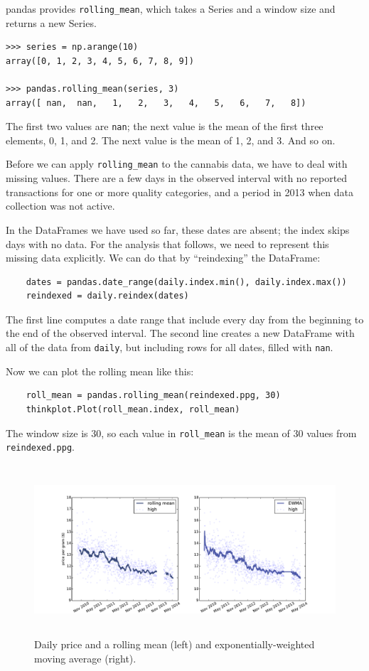 \documentclass[12pt]{book}
\begin{document}
pandas provides \verb"rolling_mean", which takes a Series and a
window size and returns a new Series.

\begin{verbatim}
>>> series = np.arange(10)
array([0, 1, 2, 3, 4, 5, 6, 7, 8, 9])

>>> pandas.rolling_mean(series, 3)
array([ nan,  nan,   1,   2,   3,   4,   5,   6,   7,   8])
\end{verbatim}

The first two values are {\tt nan}; the next value is the mean of
the first three elements, 0, 1, and 2.  The next value is the mean
of 1, 2, and 3.  And so on.

Before we can apply \verb"rolling_mean" to the cannabis data, we
have to deal with missing values.  There are a few days in the
observed interval with no reported transactions for one or more
quality categories, and a period in 2013 when data collection was
not active.

In the DataFrames we have used so far, these dates are absent;
the index skips days with no data.  For the analysis that follows,
we need to represent this missing data explicitly.  We can do
that by ``reindexing'' the DataFrame:
 
\begin{verbatim}
    dates = pandas.date_range(daily.index.min(), daily.index.max())
    reindexed = daily.reindex(dates)
\end{verbatim}

The first line computes a date range that include every day from the
beginning to the end of the observed interval.  The second line
creates a new DataFrame with all of the data from {\tt daily}, but
including rows for all dates, filled with {\tt nan}.

Now we can plot the rolling mean like this:

\begin{verbatim}
    roll_mean = pandas.rolling_mean(reindexed.ppg, 30)
    thinkplot.Plot(roll_mean.index, roll_mean)
\end{verbatim}

The window size is 30, so each value in \verb"roll_mean" is
the mean of 30 values from {\tt reindexed.ppg}.  

\begin{figure}
\centerline{\includegraphics[height=2.5in]{figs/timeseries10.pdf}}
\caption{Daily price and a rolling mean (left) and exponentially-weighted
moving average (right).}
\label{timeseries10}
\end{figure}
\end{document}
